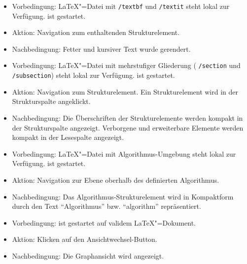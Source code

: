 
\begin{itemize}
\item Vorbedingung: \LaTeX"=Datei mit \verb|/textbf| und \verb|/textit| steht lokal zur Verfügung.
  \texla{} ist gestartet.
  \item Aktion: Navigation zum enthaltenden Strukturelement.
  \item Nachbedingung: Fetter und kursiver Text wurde gerendert.

\end{itemize}

\begin{itemize}
\item Vorbedingung: \LaTeX"=Datei mit mehrstufiger Gliederung (\zB{} \verb|/section| und \verb|/subsection|) steht
  lokal zur Verfügung.
  \texla{} ist gestartet.
  \item Aktion: Navigation zum Strukturelement.
  Ein Strukturelement wird in der Strukturspalte angeklickt.
  \item Nachbedingung: Die Überschriften der Strukturelemente werden kompakt in der Strukturspalte angezeigt.
  Verborgene und erweiterbare Elemente werden kompakt in der Lesespalte angezeigt.

\end{itemize}

\begin{itemize}
\item Vorbedingung: \LaTeX"=Datei mit Algorithmus-Umgebung steht lokal zur Verfügung.
  \texla{} ist gestartet.
  \item Aktion: Navigation zur Ebene oberhalb des definierten Algorithmus.
  \item Nachbedingung: Das Algorithmus-Strukturelement wird in Kompaktform durch den Text \enquote{Algorithmus} bzw.
  \enquote{algorithm} repräsentiert.

\end{itemize}

\begin{itemize}
\item Vorbedingung: \texla{} ist gestartet auf validem \LaTeX"=Dokument.
  \item Aktion: Klicken auf den Ansichtwechsel-Button.
  \item Nachbedingung: Die Graphansicht wird angezeigt.

\end{itemize}

